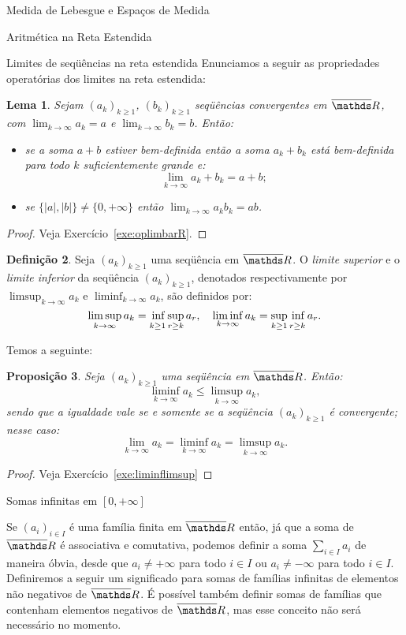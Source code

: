 \documentclass[oneside,final,11pt]{amsbook}
\newcommand{\R}{\mathds R}
\newcommand{\infsup}{\mathop{\vphantom{\sup}\inf}\limits}
\theoremstyle{remark}\newtheorem{exercise}{Exercício}[chapter]
\theoremstyle{remark}\newtheorem{*exercise}[exercise]{\hbox to 0pt{\hskip 0pt minus 1fil*}Exercício}
\theoremstyle{definition}\newtheorem{exdefin}{Definição}[chapter]
\theoremstyle{plain}\newtheorem{teo}{Teorema}[section]
\theoremstyle{plain}\newtheorem{lem}[teo]{Lema}
\theoremstyle{plain}\newtheorem{prop}[teo]{Proposição}
\theoremstyle{plain}\newtheorem{cor}[teo]{Corolário}
\theoremstyle{definition}\newtheorem{defin}[teo]{Definição}
\theoremstyle{remark}\newtheorem{rem}[teo]{Observação}
\theoremstyle{definition}\newtheorem{notation}[teo]{Notação}
\theoremstyle{definition}\newtheorem{convention}[teo]{Convenção}
\theoremstyle{definition}\newtheorem{example}[teo]{Exemplo}
\numberwithin{section}{chapter}
\numberwithin{equation}{section}
\begin{document}
\begin{chapter}{Medida de Lebesgue e Espaços de Medida}
\begin{section}{Aritmética na Reta Estendida}
\begin{subsection}{Limites de seqüências na reta estendida}
Enunciamos a seguir as propriedades operatórias dos limites na reta estendida:
\begin{lem}\label{thm:oplimbarR}
Sejam $(a_k)_{k\ge1}$, $(b_k)_{k\ge1}$ seqüências convergentes em $\overline\R$, com
$\lim_{k\to\infty}a_k=a$ e $\lim_{k\to\infty}b_k=b$. Então:
\begin{itemize}
\item se a soma $a+b$ estiver bem-definida então a soma $a_k+b_k$ está bem-definida
para todo $k$ suficientemente grande e:
\[\lim_{k\to\infty}a_k+b_k=a+b;\]
\item se $\{\vert a\vert,\vert b\vert\}\ne\{0,+\infty\}$ então $\lim_{k\to\infty}a_kb_k=ab$.
\end{itemize}
\end{lem}
\begin{proof}
Veja Exercício~\ref{exe:oplimbarR}.
\end{proof}

\begin{defin}
Seja $(a_k)_{k\ge1}$ uma seqüência em $\overline\R$. O {\em limite superior\/}
e o {\em limite inferior\/}
da seqüência $(a_k)_{k\ge1}$, denotados respectivamente por $\limsup_{k\to\infty}a_k$
e $\liminf_{k\to\infty}a_k$, são definidos por:
\[\limsup_{k\to\infty}a_k=\infsup_{k\ge1}\sup_{r\ge k}a_r,\quad\liminf_{k\to\infty}a_k=\sup_{k\ge1}\infsup_{r\ge k}a_r.\]
\end{defin}

Temos a seguinte:
\begin{prop}\label{thm:limlimsupliminf}
Seja $(a_k)_{k\ge1}$ uma seqüência em $\overline\R$. Então:
\[\liminf_{k\to\infty}a_k\le\limsup_{k\to\infty}a_k,\]
sendo que a igualdade vale se e somente se a seqüência $(a_k)_{k\ge1}$ é convergente; nesse caso:
\[\lim_{k\to\infty}a_k=\liminf_{k\to\infty}a_k=\limsup_{k\to\infty}a_k.\]
\end{prop}
\begin{proof}
Veja Exercício~\ref{exe:liminflimsup}
\end{proof}

\end{subsection}

\begin{subsection}{Somas infinitas em ${[0,+\infty]}$}
\label{sub:somasinfinitas}

Se $(a_i)_{i\in I}$ é uma família finita
em $\overline\R$ então, já que a soma de $\overline\R$ é associativa e comutativa,
podemos definir a soma $\sum_{i\in I}a_i$ de maneira óbvia, desde que
$a_i\ne+\infty$ para todo $i\in I$ ou $a_i\ne-\infty$ para todo $i\in I$.
Definiremos a seguir um significado para somas de famílias infinitas de elementos não negativos
de $\overline\R$. É possível também definir somas de famílias que contenham elementos
negativos de $\overline\R$, mas esse conceito não será necessário no momento.


\end{subsection}
\end{section}
\end{chapter}
\end{document}
